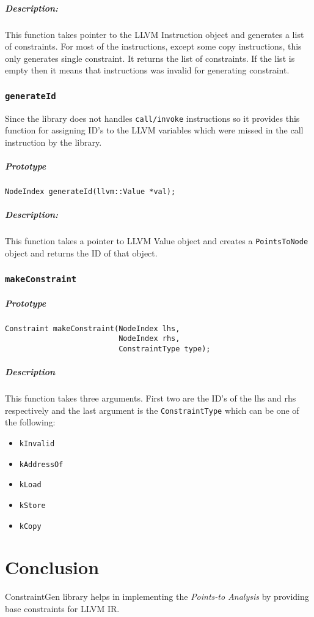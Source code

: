 \documentclass[a4paper,11pt]{report}
\begin{document}
\paragraph{Description:}
This function takes pointer to the LLVM Instruction object and generates a list
of constraints. For most of the instructions, except some copy instructions,
this only generates single constraint. It returns the list of constraints. If
the list is empty then it means that instructions was invalid for generating
constraint.

\subsection{\texttt{generateId}}
Since the library does not handles \texttt{call/invoke} instructions so it provides
this function for assigning ID's to the LLVM variables which were missed in the call
instruction by the library.

\paragraph{Prototype}
\begin{verbatim}
NodeIndex generateId(llvm::Value *val);
\end{verbatim}

\paragraph{Description:}
This function takes a pointer to LLVM Value object and creates a \texttt{PointsToNode}
object and returns the ID of that object.

\subsection{\texttt{makeConstraint}}
\paragraph{Prototype}
\begin{verbatim}
Constraint makeConstraint(NodeIndex lhs,
                          NodeIndex rhs,
                          ConstraintType type);
\end{verbatim}

\paragraph{Description}
This function takes three arguments. First two are the ID's of the lhs and rhs
respectively and the last argument is the \texttt{ConstraintType} which can be
one of the following:
\begin{itemize}
    \item \texttt{kInvalid}
    \item \texttt{kAddressOf}
    \item \texttt{kLoad}
    \item \texttt{kStore}
    \item \texttt{kCopy}
\end{itemize}

\chapter{Conclusion}
ConstraintGen library helps in implementing the \textit{Points-to Analysis} by
providing base constraints for LLVM IR.




\end{document}
